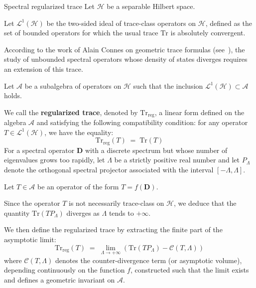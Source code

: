 \documentclass[Riemann_Hypothesis.tex]{subfiles}
\begin{document}
\begin{DefNefEn}[label=df:TraceRegularisee]{Spectral regularized trace}
    Let $\mathcal{H}$ be a separable Hilbert space. \par
    Let $\mathcal{L}^1(\mathcal{H})$ be the two-sided ideal of trace-class operators on $\mathcal{H}$, defined as the set of bounded operators for which the usual trace $\mathrm{Tr}$ is absolutely convergent. \par
    According to the work of Alain Connes on geometric trace formulas 
    (see~\cite{connes1999_trace_en}), the study of unbounded spectral operators whose density of states diverges requires an extension of this trace. \par
    Let $\mathcal{A}$ be a subalgebra of operators on $\mathcal{H}$ such that the inclusion $\mathcal{L}^1(\mathcal{H}) \subset \mathcal{A}$ holds. \par
    We call the \textbf{regularized trace}, denoted by $\mathrm{Tr}_{\mathrm{reg}}$, a linear form defined on the algebra $\mathcal{A}$ and satisfying the following compatibility condition: for any operator $T \in \mathcal{L}^1(\mathcal{H})$, we have the equality:
    \begin{equation*}
        \mathrm{Tr}_{\mathrm{reg}}(T) \;=\; \mathrm{Tr}(T)
    \end{equation*}
    For a spectral operator $\mathbf{D}$ with a discrete spectrum but whose number of eigenvalues grows too rapidly, let $\Lambda$ be a strictly positive real number and let $P_\Lambda$ denote the orthogonal spectral projector associated with the interval $[-\Lambda, \Lambda]$. \par
    Let $T \in \mathcal{A}$ be an operator of the form $T = f(\mathbf{D})$. \par
    Since the operator $T$ is not necessarily trace-class on $\mathcal{H}$, we deduce that the quantity $\mathrm{Tr}(T P_\Lambda)$ diverges as $\Lambda$ tends to $+\infty$. \par
    We then define the regularized trace by extracting the finite part of the asymptotic limit:
    \begin{equation*}
        \mathrm{Tr}_{\mathrm{reg}}(T) \;=\; \lim_{\Lambda \to +\infty} \left( \mathrm{Tr}(T P_\Lambda) - \mathcal{C}(T, \Lambda) \right)
    \end{equation*}
    where $\mathcal{C}(T, \Lambda)$ denotes the counter-divergence term (or asymptotic volume), depending continuously on the function $f$, constructed such that the limit exists and defines a geometric invariant on $\mathcal{A}$.
\end{DefNefEn}
\end{document}
